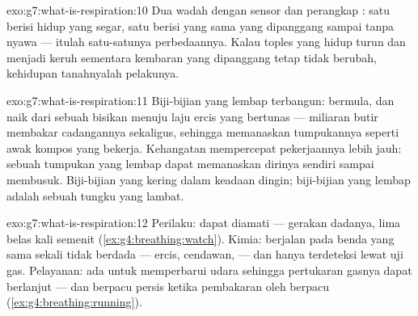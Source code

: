 \begin{solution}{exo:g7:what-is-respiration:10}
Dua wadah dengan sensor dan perangkap : satu berisi 
hidup yang segar, satu berisi  yang sama yang dipanggang sampai
tanpa nyawa --- itulah satu-satunya perbedaannya. Kalau  toples
yang hidup turun dan  menjadi keruh sementara kembaran
yang dipanggang tetap tidak berubah, kehidupan tanahnyalah pelakunya.
\end{solution}

\begin{solution}{exo:g7:what-is-respiration:11}
Biji-bijian yang lembap terbangun:  bermula, dan
 naik dari sebuah bisikan menuju laju ercis yang bertunas
--- miliaran butir membakar cadangannya sekaligus, sehingga
memanaskan tumpukannya seperti awak kompos yang bekerja. Kehangatan
mempercepat pekerjaannya lebih jauh: sebuah tumpukan yang lembap dapat
memanaskan dirinya sendiri sampai membusuk. Biji-bijian yang kering
 dalam keadaan dingin; biji-bijian yang lembap adalah sebuah
tungku yang lambat.
\end{solution}

\begin{solution}{exo:g7:what-is-respiration:12}
Perilaku:  dapat diamati --- gerakan dadanya, lima belas
kali semenit (\cref{ex:g4:breathing:watch}). Kimia:  berjalan
pada benda yang sama sekali tidak berdada --- ercis, cendawan, 
--- dan hanya terdeteksi lewat uji gas. Pelayanan:  ada
untuk memperbarui udara  sehingga pertukaran gasnya dapat
berlanjut --- dan berpacu persis ketika pembakaran oleh  berpacu
(\cref{ex:g4:breathing:running}).
\end{solution}

